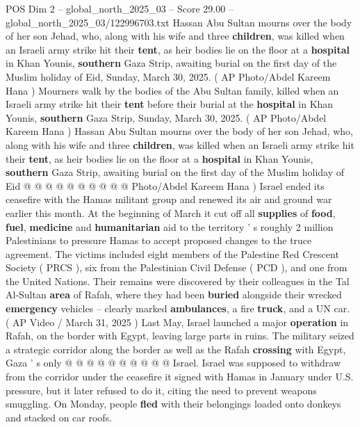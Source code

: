 \begin{textsample}{POS Dim 2 – global\_north\_2025\_03 – Score 29.00 – global\_north\_2025\_03/122996703.txt}  \label{ex:f2_pos_403}
Hassan Abu Sultan mourns over the body of her son Jehad, who, along with his wife and three \textbf{children}, was killed when an Israeli army strike hit their \textbf{tent}, as heir bodies lie on the floor at a \textbf{hospital} in Khan Younis, \textbf{southern} Gaza Strip, awaiting burial on the first day of the Muslim holiday of Eid, Sunday, March 30, 2025. ( AP Photo/Abdel Kareem Hana ) Mourners walk by the bodies of the Abu Sultan family, killed when an Israeli army strike hit their \textbf{tent} before their burial at the \textbf{hospital} in Khan Younis, \textbf{southern} Gaza Strip, Sunday, March 30, 2025. ( AP Photo/Abdel Kareem Hana ) Hassan Abu Sultan mourns over the body of her son Jehad, who, along with his wife and three \textbf{children}, was killed when an Israeli army strike hit their \textbf{tent}, as heir bodies lie on the floor at a \textbf{hospital} in Khan Younis, \textbf{southern} Gaza Strip, awaiting burial on the first day of the Muslim holiday of Eid @ @ @ @ @ @ @ @ @ @ Photo/Abdel Kareem Hana ) Israel ended its ceasefire with the Hamas militant group and renewed its air and ground war earlier this month.
At the beginning of March it cut off all \textbf{supplies} of \textbf{food}, \textbf{fuel}, \textbf{medicine} and \textbf{humanitarian} aid to the territory ' s roughly 2 million Palestinians to pressure Hamas to accept proposed changes to the truce agreement.
The victims included eight members of the Palestine Red Crescent Society ( PRCS ), six from the Palestinian Civil Defense ( PCD ), and one from the United Nations.
Their remains were discovered by their colleagues in the Tal Al-Sultan \textbf{area} of Rafah, where they had been \textbf{buried} alongside their wrecked \textbf{emergency} vehicles -- clearly marked \textbf{ambulances}, a fire \textbf{truck}, and a UN car. ( AP Video / March 31, 2025 ) Last May, Israel launched a major \textbf{operation} in Rafah, on the border with Egypt, leaving large parts in ruins.
The military seized a strategic corridor along the border as well as the Rafah \textbf{crossing} with Egypt, Gaza ' s only @ @ @ @ @ @ @ @ @ @ Israel.
Israel was supposed to withdraw from the corridor under the ceasefire it signed with Hamas in January under U.S. pressure, but it later refused to do it, citing the need to prevent weapons smuggling.
On Monday, people \textbf{fled} with their belongings loaded onto donkeys and stacked on car roofs.

\end{textsample}
